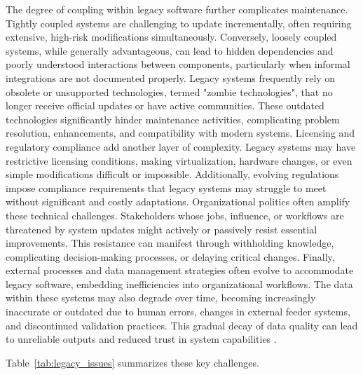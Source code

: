 The degree of coupling within legacy software further complicates maintenance.
Tightly coupled systems are challenging to update incrementally, often requiring extensive, high-risk modifications simultaneously.
Conversely, loosely coupled systems, while generally advantageous, can lead to hidden dependencies and poorly understood interactions between components, particularly when informal integrations are not documented properly.
Legacy systems frequently rely on obsolete or unsupported technologies, termed "zombie technologies", that no longer receive official updates or have active communities.
These outdated technologies significantly hinder maintenance activities, complicating problem resolution, enhancements, and compatibility with modern systems.
Licensing and regulatory compliance add another layer of complexity.
Legacy systems may have restrictive licensing conditions, making virtualization, hardware changes, or even simple modifications difficult or impossible.
Additionally, evolving regulations impose compliance requirements that legacy systems may struggle to meet without significant and costly adaptations.
Organizational politics often amplify these technical challenges.
Stakeholders whose jobs, influence, or workflows are threatened by system updates might actively or passively resist essential improvements.
This resistance can manifest through withholding knowledge, complicating \mbox{decision-making} processes, or delaying critical changes.
Finally, external processes and data management strategies often evolve to accommodate legacy software, embedding inefficiencies into organizational workflows.
The data within these systems may also degrade over time, becoming increasingly inaccurate or outdated due to human errors, changes in external feeder systems, and discontinued validation practices.
This gradual decay of data quality can lead to unreliable outputs and reduced trust in system capabilities \citep{annettWorkingLegacySystems2019}.

Table~\ref{tab:legacy_issues} summarizes these key challenges.

